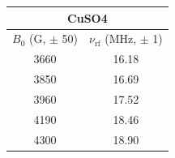 \begin{tabular}{cc}
\hline
\multicolumn{2}{c}{CuSO4} \\
\hline
$B_0$ (G, $\pm$ 50) & $\nu_{\mathrm{rf}}$ (MHz, $\pm$ 1) \\
\hline
3660 & 16.18 \\
3850 & 16.69 \\
3960 & 17.52 \\
4190 & 18.46 \\
4300 & 18.90 \\
\hline
\end{tabular}
